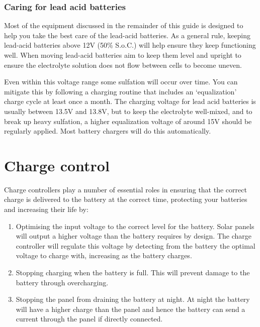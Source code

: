 \documentclass{article}
\theoremstyle{definition}
\theoremstyle{definition}
\theoremstyle{remark}
\begin{document}

    \subsubsection{Caring for lead acid batteries} %
    \label{ssub:caring_for_lead_acid_batteries}

      Most of the equipment discussed in the remainder of this guide is designed to help you take the best care of the lead-acid batteries. As a general rule, keeping lead-acid batteries above 12V (50\% S.o.C.) will help ensure they keep functioning well. When moving lead-acid batteries aim to keep them level and upright to ensure the electrolyte solution does not flow between cells to become uneven.

      Even within this voltage range some sulfation will occur over time. You can mitigate this by following a charging routine that includes an ‘equalization’ charge cycle at least once a month. The charging voltage for lead acid batteries is usually between 13.5V and 13.8V, but to keep the electrolyte well-mixed, and to break up heavy sulfation, a higher equalization voltage of around 15V should be regularly applied. Most battery chargers will do this automatically. 





{\color{blue}\section{Charge control}} %
\label{sec:charge_control}

  Charge controllers play a number of essential roles in ensuring that the correct charge is delivered to the battery at the correct time, protecting your batteries and increasing their life by: 

  \begin{enumerate}
    \item Optimising the input voltage to the correct level for the battery. Solar panels will output a higher voltage than the battery requires by design. The charge controller will regulate this voltage by detecting from the battery the optimal voltage to charge with, increasing as the battery charges. 
    \item Stopping charging when the battery is full. This will prevent damage to the battery through overcharging. 
    \item Stopping the panel from draining the battery at night. At night the battery will have a higher charge than the panel and hence the battery can send a current through the panel if directly connected. 
  \end{enumerate}
\end{document}
